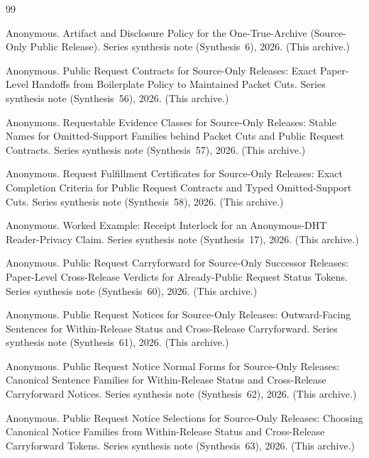 \documentclass[11pt]{article}
\begin{document}
\begin{thebibliography}{99}\small

Anonymous.
\newblock Artifact and Disclosure Policy for the One-True-Archive (Source-Only Public Release).
\newblock Series synthesis note (Synthesis~6), 2026. (This archive.)

Anonymous.
\newblock Public Request Contracts for Source-Only Releases: Exact Paper-Level Handoffs from Boilerplate Policy to Maintained Packet Cuts.
\newblock Series synthesis note (Synthesis~56), 2026. (This archive.)

Anonymous.
\newblock Requestable Evidence Classes for Source-Only Releases: Stable Names for Omitted-Support Families behind Packet Cuts and Public Request Contracts.
\newblock Series synthesis note (Synthesis~57), 2026. (This archive.)

Anonymous.
\newblock Request Fulfillment Certificates for Source-Only Releases: Exact Completion Criteria for Public Request Contracts and Typed Omitted-Support Cuts.
\newblock Series synthesis note (Synthesis~58), 2026. (This archive.)

Anonymous.
\newblock Worked Example: Receipt Interlock for an Anonymous-DHT Reader-Privacy Claim.
\newblock Series synthesis note (Synthesis~17), 2026. (This archive.)

Anonymous.
\newblock Public Request Carryforward for Source-Only Successor Releases: Paper-Level Cross-Release Verdicts for Already-Public Request Status Tokens.
\newblock Series synthesis note (Synthesis~60), 2026. (This archive.)

Anonymous.
\newblock Public Request Notices for Source-Only Releases: Outward-Facing Sentences for Within-Release Status and Cross-Release Carryforward.
\newblock Series synthesis note (Synthesis~61), 2026. (This archive.)

Anonymous.
\newblock Public Request Notice Normal Forms for Source-Only Releases: Canonical Sentence Families for Within-Release Status and Cross-Release Carryforward Notices.
\newblock Series synthesis note (Synthesis~62), 2026. (This archive.)

Anonymous.
\newblock Public Request Notice Selections for Source-Only Releases: Choosing Canonical Notice Families from Within-Release Status and Cross-Release Carryforward Tokens.
\newblock Series synthesis note (Synthesis~63), 2026. (This archive.)


\end{thebibliography}
\end{document}
